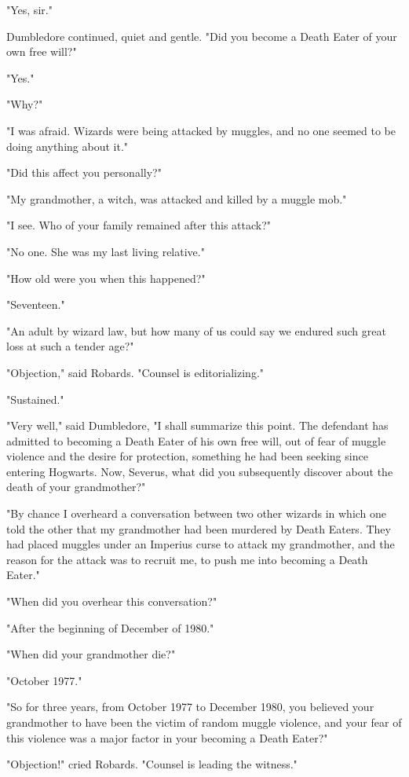 "Yes, sir."

Dumbledore continued, quiet and gentle. "Did you become a Death Eater of your own free will?"

"Yes."

"Why?"

"I was afraid. Wizards were being attacked by muggles, and no one seemed to be doing anything about it."

"Did this affect you personally?"

"My grandmother, a witch, was attacked and killed by a muggle mob."

"I see. Who of your family remained after this attack?"

"No one. She was my last living relative."

"How old were you when this happened?"

"Seventeen."

"An adult by wizard law, but how many of us could say we endured such great loss at such a tender age?"

"Objection," said Robards. "Counsel is editorializing."

"Sustained."

"Very well," said Dumbledore, "I shall summarize this point. The defendant has admitted to becoming a Death Eater of his own free will, out of fear of muggle violence and the desire for protection, something he had been seeking since entering Hogwarts. Now, Severus, what did you subsequently discover about the death of your grandmother?"

"By chance I overheard a conversation between two other wizards in which one told the other that my grandmother had been murdered by Death Eaters. They had placed muggles under an Imperius curse to attack my grandmother, and the reason for the attack was to recruit me, to push me into becoming a Death Eater."

"When did you overhear this conversation?"

"After the beginning of December of 1980."

"When did your grandmother die?"

"October 1977."

"So for three years, from October 1977 to December 1980, you believed your grandmother to have been the victim of random muggle violence, and your fear of this violence was a major factor in your becoming a Death Eater?"

"Objection!" cried Robards. "Counsel is leading the witness."

